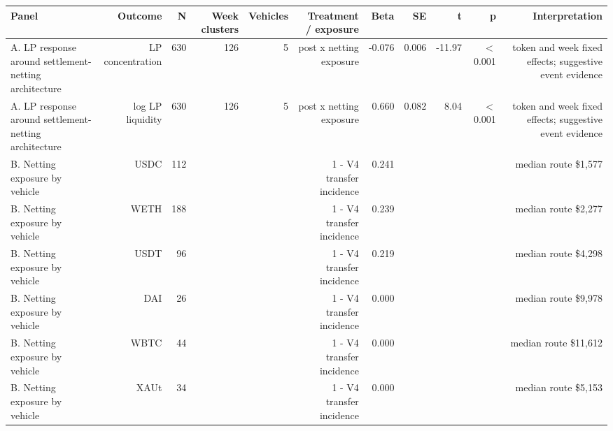 \begin{tabular}{lrrrrrrrrrr}
\toprule
Panel & Outcome & N & Week clusters & Vehicles & Treatment / exposure & Beta & SE & t & p & Interpretation \\
\midrule
A. LP response around settlement-netting architecture & LP concentration & 630 & 126 & 5 & post x netting exposure & -0.076 & 0.006 & -11.97 & \ensuremath{<}0.001 & token and week fixed effects; suggestive event evidence \\
A. LP response around settlement-netting architecture & log LP liquidity & 630 & 126 & 5 & post x netting exposure & 0.660 & 0.082 & 8.04 & \ensuremath{<}0.001 & token and week fixed effects; suggestive event evidence \\
B. Netting exposure by vehicle & USDC & 112 &  &  & 1 - V4 transfer incidence & 0.241 &  &  &  & median route \$1,577 \\
B. Netting exposure by vehicle & WETH & 188 &  &  & 1 - V4 transfer incidence & 0.239 &  &  &  & median route \$2,277 \\
B. Netting exposure by vehicle & USDT & 96 &  &  & 1 - V4 transfer incidence & 0.219 &  &  &  & median route \$4,298 \\
B. Netting exposure by vehicle & DAI & 26 &  &  & 1 - V4 transfer incidence & 0.000 &  &  &  & median route \$9,978 \\
B. Netting exposure by vehicle & WBTC & 44 &  &  & 1 - V4 transfer incidence & 0.000 &  &  &  & median route \$11,612 \\
B. Netting exposure by vehicle & XAUt & 34 &  &  & 1 - V4 transfer incidence & 0.000 &  &  &  & median route \$5,153 \\
\bottomrule
\end{tabular}
